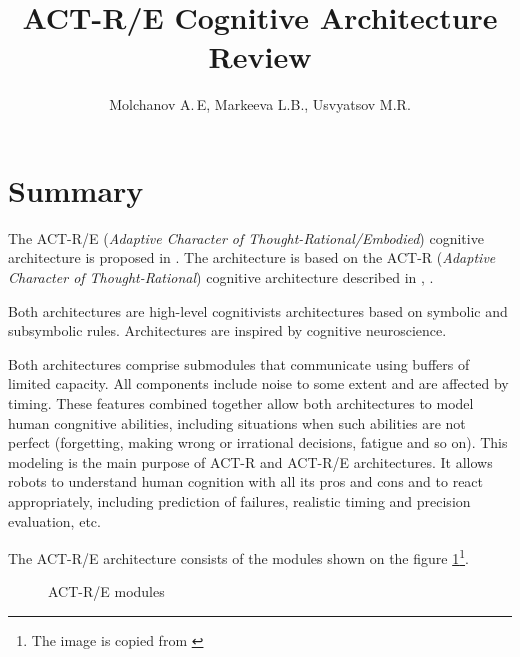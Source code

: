\documentclass[10pt]{article}
\title{ACT-R/E Cognitive Architecture Review}
\author{Molchanov A.\,E, Markeeva L.B., Usvyatsov M.R.}
\begin{document}
\maketitle
\section{Summary}

The ACT-R/E (\emph{Adaptive Character of Thought-Rational/Embodied}) cognitive architecture is proposed in \cite{actre}. The architecture is based on the ACT-R (\emph{Adaptive Character of Thought-Rational}) cognitive architecture described in \cite{actr1}, \cite{actr2}. 

Both architectures are high-level cognitivists architectures based on symbolic and subsymbolic rules. Architectures are inspired by cognitive neuroscience. 

Both architectures comprise submodules that communicate using buffers of limited capacity. All components include noise to some extent and are affected by timing. These features combined together allow both architectures to model human congnitive abilities, including situations when such abilities are not perfect (forgetting, making wrong or irrational decisions, fatigue and so on). This modeling is the main purpose of ACT-R and ACT-R/E architectures. It allows robots to understand human cognition with all its pros and cons and to react appropriately, including prediction of failures, realistic timing and precision evaluation, etc.

The ACT-R/E architecture consists of the modules shown on the figure \ref{fig:modules}\footnote{The image is copied from \cite{actre}}. 

\noindent


\begin{figure}[h!]
	\caption{ACT-R/E modules }
	\label{fig:modules}
\end{figure}
\end{document}
